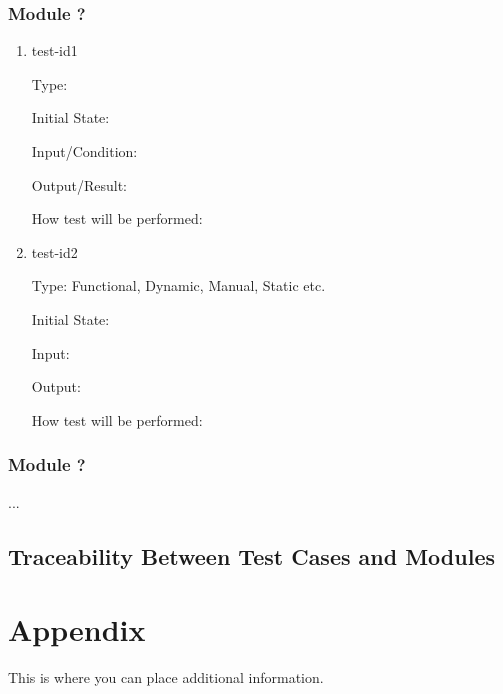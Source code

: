 \documentclass[12pt, titlepage]{article}
\begin{document}
\subsubsection{Module ?}
		
\begin{enumerate}

\item{test-id1\\}

Type: 
					
Initial State: 
					
Input/Condition: 
					
Output/Result: 
					
How test will be performed: 
					
\item{test-id2\\}

Type: Functional, Dynamic, Manual, Static etc.
					
Initial State: 
					
Input: 
					
Output: 
					
How test will be performed: 

\end{enumerate}

\subsubsection{Module ?}

...

\subsection{Traceability Between Test Cases and Modules}

				




\newpage

\section{Appendix}

This is where you can place additional information.
\end{document}
